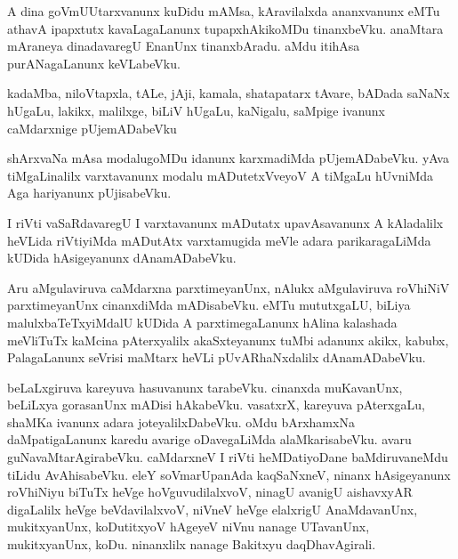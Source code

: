 \documentclass{article}
\begin{document}
\begin{mn}
A dina  goVmUUtarxvanunx  kuDidu  mAMsa,  kAravilalxda  ananxvanunx  eMTu  athavA  ipapxtutx  
kavaLagaLanunx  tupapxhAkikoMDu  tinanxbeVku.  anaMtara  mAraneya  dinadavaregU  EnanUnx  
tinanxbAradu.  aMdu  itihAsa  purANagaLanunx  keVLabeVku.
\end{mn}

\begin{mn}
kadaMba,  niloVtapxla,  tALe,  jAji,  kamala,  shatapatarx  tAvare,  bADada  saNaNx  hUgaLu,  
lakikx,  malilxge,  biLiV  hUgaLu,  kaNigalu,  saMpige  ivanunx  caMdarxnige  pUjemADabeVku
\end{mn}

\begin{mn}
shArxvaNa  mAsa  modalugoMDu  idanunx  karxmadiMda  pUjemADabeVku.  yAva  tiMgaLinalilx  
varxtavanunx  modalu  mADutetxVveyoV  A  tiMgaLu  hUvniMda  Aga  hariyanunx  pUjisabeVku.
\end{mn}

\begin{mn}
I riVti  vaSaRdavaregU  I  varxtavanunx  mADutatx  upavAsavanunx  A  kAladalilx  heVLida  
riVtiyiMda  mADutAtx  varxtamugida  meVle  adara  parikaragaLiMda  kUDida  hAsigeyanunx  dAnamADabeVku.
\end{mn}

\begin{mn}
Aru  aMgulaviruva  caMdarxna  parxtimeyanUnx,  nAlukx  aMgulaviruva  roVhiNiV  parxtimeyanUnx  
cinanxdiMda  mADisabeVku.  eMTu  mututxgaLU,  biLiya  malulxbaTeTxyiMdalU  kUDida  A  
parxtimegaLanunx  hAlina  kalashada  meVliTuTx  kaMcina  pAterxyalilx  akaSxteyanunx  tuMbi  
adanunx  akikx,  kabubx,  PalagaLanunx  seVrisi  maMtarx  heVLi  pUvARhaNxdalilx  dAnamADabeVku.
\end{mn}

\begin{mn}
beLaLxgiruva  kareyuva  hasuvanunx  tarabeVku.  cinanxda  muKavanUnx,  beLiLxya  gorasanUnx  
mADisi  hAkabeVku.  vasatxrX,  kareyuva  pAterxgaLu,  shaMKa  ivanunx  adara  joteyalilxDabeVku.  
oMdu  bArxhamxNa  daMpatigaLanunx  karedu  avarige  oDavegaLiMda  alaMkarisabeVku.  avaru  
guNavaMtarAgirabeVku.  caMdarxneV  I riVti  heMDatiyoDane  baMdiruvaneMdu  tiLidu  AvAhisabeVku.  
eleY  soVmarUpanAda  kaqSaNxneV,  ninanx  hAsigeyanunx  roVhiNiyu  biTuTx  heVge  hoVguvudilalxvoV,  
ninagU  avanigU  aishavxyAR digaLalilx  heVge  beVdavilalxvoV,  niVneV  heVge  elalxrigU  AnaMdavanUnx,  
mukitxyanUnx,  koDutitxyoV  hAgeyeV  niVnu  nanage  UTavanUnx,  mukitxyanUnx,  koDu.  ninanxlilx  
nanage  Bakitxyu  daqDhavAgirali.
\end{mn}
\end{document}
